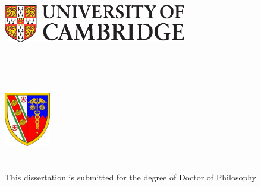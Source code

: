 \begin{titlepage}
	\begin{addmargin}[-1cm]{-3cm}
    \begin{center}
        \large  
        \vfill
        \includegraphics[width=8cm]{gfx/uc-pantone.eps} \\ \medskip

        \vfill

        \begingroup
            \color{Maroon}\spacedallcaps{\myTitle} \\ \bigskip
        \endgroup
	
	 \mySubtitle \\ \medskip  

        \spacedlowsmallcaps{\myName}

        \vfill

        \includegraphics[width=2cm]{gfx/darwin.jpg} \\
 
        \myFaculty \\
        \bigskip
		\vfill
        \myTime\\
        \medskip
        This dissertation is submitted for the degree of Doctor of Philosophy
                   

    \end{center}  
  \end{addmargin}       
\end{titlepage}   